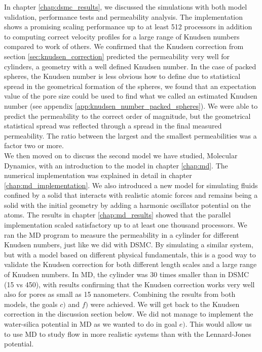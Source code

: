 In chapter \ref{chap:dsmc_results}, we discussed the simulations with both model validation, performance tests and permeability analysis. The implementation shows a promising scaling performance up to at least 512 processors in addition to computing correct velocity profiles for a large range of Knudsen numbers compared to work of others. We confirmed that the Knudsen correction from section \ref{sec:knudsen_correction} predicted the permeability very well for cylinders, a geometry with a well defined Knudsen number. In the case of packed spheres, the Knudsen number is less obvious how to define due to statistical spread in the geometrical formation of the spheres, we found that an expectation value of the pore size could be used to find what we called an estimated Knudsen number (see appendix \ref{app:knudsen_number_packed_spheres}). We were able to predict the permeability to the correct order of magnitude, but the geometrical statistical spread was reflected through a spread in the final measured permeability. The ratio between the largest and the smallest permeabilities was a factor two or more.\\
We then moved on to discuss the second model we have studied, Molecular Dynamics, with an introduction to the model in chapter \ref{chap:md}. The numerical implementation was explained in detail in chapter \ref{chap:md_implementation}. We also introduced a new model for simulating fluids confined by a solid that interacts with realistic atomic forces and remains being a solid with the initial geometry by adding a harmonic oscillator potential on the atoms. The results in chapter \ref{chap:md_results} showed that the parallel implementation scaled satisfactory up to at least one thousand processors. We ran the MD program to measure the permeability in a cylinder for different Knudsen numbers, just like we did with DSMC. By simulating a similar system, but with a model based on different physical fundamentals, this is a good way to validate the Knudsen correction for both different length scales and a large range of Knudsen numbers. In MD, the cylinder was 30 times smaller than in DSMC (\unit{15}{\nano\meter} vs \unit{450}{\nano\meter}), with results confirming that the Knudsen correction works very well also for pores as small as 15 nanometers. Combining the results from both models, the goals $c)$ and $f)$ were achieved. We will get back to the Knudsen correction in the discussion section below. We did not manage to implement the water-silica potential in MD as we wanted to do in goal $e)$. This would allow us to use MD to study flow in more realistic systems than with the Lennard-Jones potential. 
